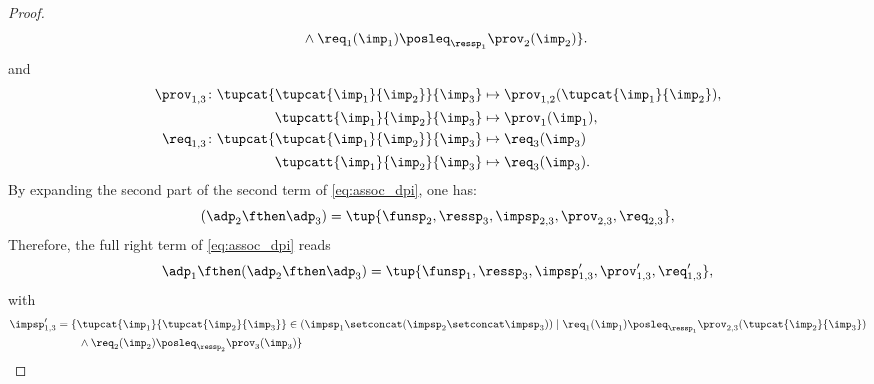 \begin{proof}
\begin{equation}
\begin{aligned}
                         & \qquad \wedge \req_{1}(\imp_{1})\posleq_{\ressp_1}\prov_2(\imp_2)\}.                                                                                                                                        
        \end{aligned}
    \end{equation}
    and
    \begin{equation}
        \begin{aligned}
            \prov_{1,3} \colon \tupcat {\tupcat {\imp_{1}} {\imp_{2}}} {\imp_{3}} & \mapsto\prov_{1,2}(\tupcat {\imp_{1}} {\imp_{2}}), \\
            \tupcatt{\imp_{1}}{\imp_{2}}{\imp_{3}}                                & \mapsto \prov_1(\imp_{1}),                         \\
            \req_{1,3} \colon \tupcat {\tupcat {\imp_{1}} {\imp_{2}}} {\imp_{3}}  & \mapsto\req_{3}(\imp_{3})                          \\
            \tupcatt{\imp_{1}}{\imp_{2}}{\imp_{3}}                                & \mapsto\req_{3}(\imp_{3}).                         
        \end{aligned}
    \end{equation}
    By expanding the second part of the second term of \cref{eq:assoc_dpi}, one has:
    \begin{equation}
        (\adp_{2} \fthen \adp_{3})
        =
        \tup{ \funsp_{2},\ressp_{3},\impsp_{2,3},\prov_{2,3},\req_{2,3}},
    \end{equation}
    Therefore, the full right term of \cref{eq:assoc_dpi} reads
    \begin{equation}
        \label{eq:dpi_ass_2}
        \adp_{1} \fthen (\adp_{2}\fthen \adp_{3})=\tup{ \funsp_{1},\ressp_{3},\impsp'_{1,3},\prov'_{1,3},\req'_{1,3}},
    \end{equation}
    with
    \begin{equation}
        \begin{aligned}
            \impsp_{1,3}' & =  \{  \tupcat {\imp_{1}} {\tupcat {\imp_{2}} {\imp_{3}}} \in (\impsp_{1} \setconcat (\impsp_{2}\setconcat \impsp_{3}))\mid\req_{1}(\imp_{1})\posleq_{\ressp_{1}}\prov_{2,3}(\tupcat {\imp_{2}} {\imp_{3}}) \\
                          & \qquad \wedge \req_2(\imp_2)\posleq_{\ressp_2}\prov_3(\imp_3)\}                                                                                                                                             \\

\end{aligned}
\end{equation}
\end{proof}
